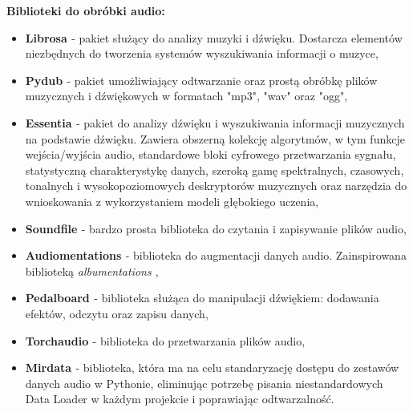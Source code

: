 \documentclass[a4paper,titleauthor]{mwart}
\begin{document}
\textbf{Biblioteki do obróbki audio:}
\begin{itemize}
    \item \textbf{Librosa \cite{librosa}} - pakiet służący do analizy muzyki i dźwięku. Dostarcza elementów niezbędnych do tworzenia systemów wyszukiwania informacji o muzyce,
    \item \textbf{Pydub \cite{pydub}} -  pakiet umożliwiający odtwarzanie oraz prostą obróbkę plików muzycznych i dźwiękowych w formatach "mp3", "wav" oraz "ogg",
    \item \textbf{Essentia \cite{Essentia}} - pakiet do analizy dźwięku i wyszukiwania informacji muzycznych na podstawie dźwięku. Zawiera obszerną kolekcję algorytmów, w tym funkcje wejścia/wyjścia audio, standardowe bloki cyfrowego przetwarzania sygnału, statystyczną charakterystykę danych, szeroką gamę spektralnych, czasowych, tonalnych i wysokopoziomowych deskryptorów muzycznych oraz narzędzia do wnioskowania z wykorzystaniem modeli głębokiego uczenia,
    \item \textbf{Soundfile \cite{Soundfile}} - bardzo prosta biblioteka do czytania i zapisywanie plików audio,
    \item \textbf{Audiomentations \cite{Audiomentations}} - biblioteka do augmentacji danych audio. Zainspirowana biblioteką \textit{albumentations \cite{albumentations}},
    \item \textbf{Pedalboard \cite{pedalboard}} - biblioteka służąca do manipulacji dźwiękiem: dodawania efektów, odczytu oraz zapisu danych,
    \item \textbf{Torchaudio \cite{Torchaudio}} - biblioteka do przetwarzania plików audio,
    \item \textbf{Mirdata \cite{mirdata}} - biblioteka, która ma na celu standaryzację dostępu do zestawów danych audio w Pythonie, eliminując potrzebę pisania niestandardowych Data Loader w każdym projekcie i poprawiając odtwarzalność.\newline
\end{itemize}
\end{document}
